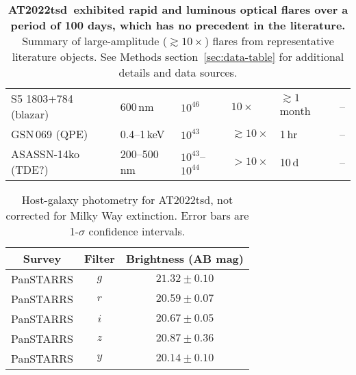 \documentclass{nature_plusfigure}
\newcommand{\at}{AT2022tsd}
\begin{document}
\begin{supplement}
\begin{table}
\begin{tabular}{llllll}
    S5 1803+784 (blazar) & 600\,nm & $10^{46}$ & $10\times$ & $\gtrsim1\,$month & -- \\
    GSN\,069 (QPE) & 0.4--1\,keV & $10^{43}$ & $\gtrsim10\times$ & 1\,hr & -- \\
    ASASSN-14ko (TDE?) & 200--500\,nm & $10^{43}$--$10^{44}$ & $>10\times$ & 10\,d & -- \\
    \hline\hline
    \end{tabular}
    \caption{\textbf{\at\ exhibited rapid and luminous optical flares over a period of 100 days, which has no precedent in the literature.} Summary of large-amplitude ($\gtrsim10\times$) flares from representative literature objects. See Methods section~\ref{sec:data-table} for additional details and data sources.}
    \label{tab:flaring-classes}
\end{table}

\clearpage

%

\begin{table}
\begin{center}
\caption{Host-galaxy photometry for \at, not corrected for Milky Way extinction. Error bars are 1-$\sigma$ confidence intervals.}
\label{tab:host-photometry}
\begin{tabular}{ccc} 
\hline\hline
Survey & Filter & Brightness (AB mag) \\
\hline
PanSTARRS & $g$               &$ 21.32 \pm 0.10 $\\
PanSTARRS & $r$               &$ 20.59 \pm 0.07 $\\
PanSTARRS & $i$               &$ 20.67 \pm 0.05 $\\
PanSTARRS & $z$               &$ 20.87 \pm 0.36 $\\
PanSTARRS & $y$               &$ 20.14 \pm 0.10 $\\
\hline
\end{tabular}
\end{center}
\end{table}


\end{supplement}
\end{document}
